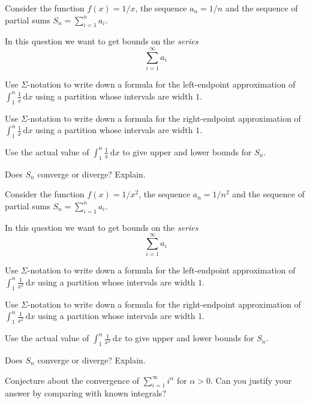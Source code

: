 \documentclass{workbook}
\begin{document}
\begin{slide}
	\question
	Consider the function $f(x)=1/x$, the sequence $a_n=1/n$ and
	the sequence of partial sums $\displaystyle S_n = \sum_{i=1}^n a_i$.

	In this question we want to get bounds on the \emph{series}
	\[
		\sum_{i=1}^\infty a_i
	\]
	\begin{parts}
		\item Use $\Sigma$-notation to write down a formula for the left-endpoint approximation of
		$\displaystyle \int_1^n \frac{1}{x}\,\mathrm d x$ using a partition
		whose intervals are width $1$.

		\bigskip
		\bigskip
		\bigskip
		\item Use $\Sigma$-notation to write down a formula for the right-endpoint approximation of
		$\displaystyle \int_1^n \frac{1}{x}\,\mathrm d x$ using a partition
		whose intervals are width $1$.
		\item Use the actual value of $\displaystyle \int_1^n \frac{1}{x}\,\mathrm d x$ to give upper and lower bounds for $S_n$.
		\item Does $S_n$ converge or diverge? Explain.
	\end{parts}
\end{slide}

\begin{slide}
	\question
	Consider the function $f(x)=1/x^2$, the sequence $a_n=1/n^2$ and
	the sequence of partial sums $\displaystyle S_n = \sum_{i=1}^n a_i$.

	In this question we want to get bounds on the \emph{series}
	\[
		\sum_{i=1}^\infty a_i
	\]
	\begin{parts}
		\item Use $\Sigma$-notation to write down a formula for the left-endpoint approximation of
		$\displaystyle \int_1^n \frac{1}{x^2}\,\mathrm d x$ using a partition
		whose intervals are width $1$.

		\bigskip
		\bigskip
		\bigskip
		\item Use $\Sigma$-notation to write down a formula for the right-endpoint approximation of
		$\displaystyle \int_1^n \frac{1}{x^2}\,\mathrm d x$ using a partition
		whose intervals are width $1$.
		\item Use the actual value of $\displaystyle \int_1^n \frac{1}{x^2}\,\mathrm d x$ to give upper and lower bounds for $S_n$.
		\item Does $S_n$ converge or diverge? Explain.
		\item Conjecture about the convergence of $\displaystyle \sum_{i=1}^\infty i^{\alpha}$ for $\alpha> 0$. Can you justify your answer by comparing with known integrals?
	\end{parts}
\end{slide}
\end{document}
